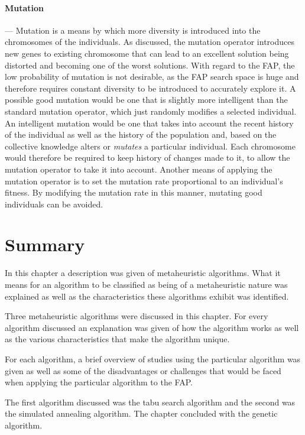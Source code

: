 \paragraph{Mutation}
--- Mutation is a means by which more diversity is introduced into the chromosomes of the individuals.  As discussed, the mutation operator introduces new genes to existing chromosome that can lead to an excellent solution being distorted and becoming one of the worst solutions. With regard to the \gls{FAP}, the low probability of mutation is not desirable, as the \gls{FAP} search space is huge and therefore requires constant diversity to be introduced to accurately explore it. A possible good mutation would be one that is slightly more intelligent than the standard mutation operator, which just randomly modifies a selected individual. An intelligent mutation would be one that takes into account the recent history of the individual as well as the history of the population and, based on the collective knowledge alters or \emph{mutates} a particular individual. Each chromosome would therefore be required to keep history of changes made to it, to allow the mutation operator to take it into account. Another means of applying the mutation operator is to set the mutation rate proportional to an individual's fitness. By modifying the mutation rate in this manner, mutating good individuals can be avoided.
\section {Summary}
In this chapter a description was given of metaheuristic algorithms. What it means for an algorithm to be classified as being of a metaheuristic nature was explained as well as the characteristics these algorithms exhibit was identified.

Three metaheuristic algorithms were discussed in this chapter. For every algorithm discussed an explanation was given of how the algorithm works as well as the various characteristics that make the algorithm unique.

For each algorithm, a brief overview of studies using the particular algorithm was given as well as some of the disadvantages or challenges that would be faced when applying the particular algorithm to the \gls{FAP}.

The first algorithm discussed was the tabu search algorithm and the second was the simulated annealing algorithm. The chapter concluded with the genetic algorithm. 

